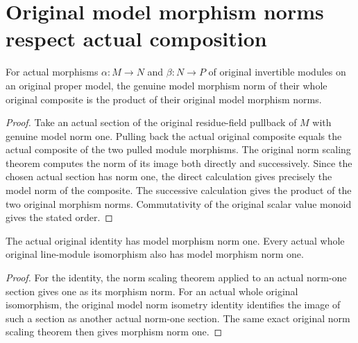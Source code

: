 \section{Original model morphism norms respect actual composition}

\begin{lemma}
\label{lem:actual-model-hom-norm-composition}
\leanok
{}
For actual morphisms $\alpha:M\to N$ and $\beta:N\to P$ of
original invertible modules on an original proper model, the
genuine model morphism norm of their whole original composite is
the product of their original model morphism norms.
\end{lemma}
\begin{proof}
Take an actual section of the original residue-field pullback of
$M$ with genuine model norm one. Pulling back the actual original
composite equals the actual composite of the two pulled module
morphisms. The original norm scaling theorem computes the norm of
its image both directly and successively. Since the chosen actual
section has norm one, the direct calculation gives precisely the
model norm of the composite. The successive calculation gives the
product of the two original morphism norms. Commutativity of the
original scalar value monoid gives the stated order.
\end{proof}

\begin{corollary}
\label{cor:actual-model-hom-norm-identity-isomorphism}
\leanok
{}
The actual original identity has model morphism norm one. Every
actual whole original line-module isomorphism also has model
morphism norm one.
\end{corollary}
\begin{proof}
For the identity, the norm scaling theorem applied to an actual
norm-one section gives one as its morphism norm. For an actual
whole original isomorphism, the original model norm isometry
identity identifies the image of such a section as another actual
norm-one section. The same exact original norm scaling theorem
then gives morphism norm one.
\end{proof}
